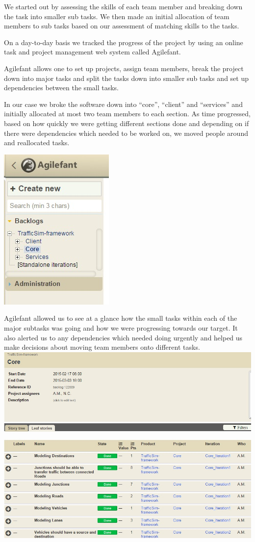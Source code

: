 We started out by assessing the skills of each team member and breaking down the task into smaller sub tasks.  We then made an initial allocation of team members to sub tasks based on our assessment of matching skills to the tasks.

On a day-to-day basis we tracked the progress of the project by using an online task and project management web system called Agilefant. 

Agilefant allows one to set up projects, assign team members, break the project down into major tasks and split the tasks down into smaller sub tasks and set up dependencies between the small tasks.

In our case we broke the software down into “core”, “client” and “services” and initially allocated at most two team members to each section.  As time progressed, based on how quickly we were getting different sections done and depending on if there were dependencies which needed to be worked on, we moved people around and reallocated tasks.


\includegraphics[scale=0.7]{./images/menu.jpg}

Agilefant allowed us to see at a glance how the small tasks within each of the major subtasks was going and how we were progressing towards our target.  It also alerted us to any dependencies which needed doing urgently and helped us make decisions about moving team members onto different tasks. \\
\includegraphics[scale=0.5]{./images/tasks.jpg}

